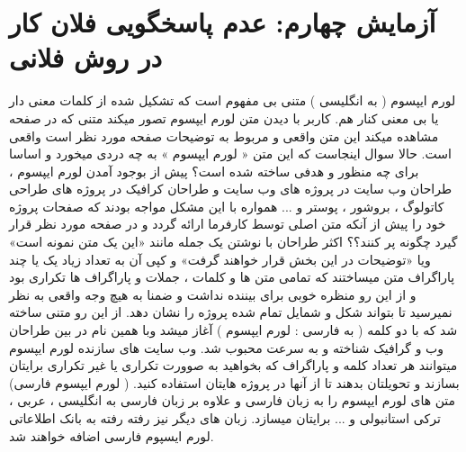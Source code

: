 \section{آزمایش چهارم: عدم پاسخگویی فلان کار در روش فلانی}
لورم ایپسوم ( به انگلیسی  ) متنی بی مفهوم است که تشکیل شده از کلمات معنی دار یا بی معنی کنار هم. کاربر با دیدن متن لورم ایپسوم تصور میکند متنی که در صفحه مشاهده میکند این متن واقعی و مربوط به توضیحات صفحه مورد نظر است واقعی است. حالا سوال اینجاست که این متن « لورم ایپسوم » به چه دردی میخورد و اساسا برای چه منظور و هدفی ساخته شده است؟ پیش از بوجود آمدن لورم ایپسوم ، طراحان وب سایت در پروژه های وب سایت و طراحان کرافیک در پروژه های طراحی کاتولوگ ، بروشور ، پوستر و ... همواره با این مشکل مواجه بودند که صفحات پروژه خود را پیش از آنکه متن اصلی توسط کارفرما ارائه گردد و در صفحه مورد نظر قرار گیرد چگونه پر کنند؟؟ اکثر طراحان با نوشتن یک جمله مانند «این یک متن نمونه است» ویا «توضیحات در این بخش قرار خواهند گرفت» و کپی آن به تعداد زیاد یک یا چند پاراگراف متن میساختند که تمامی متن ها و کلمات ، جملات و پاراگراف ها تکراری بود و از این رو منظره خوبی برای بیننده نداشت و ضمنا به هیچ وجه واقعی به نظر نمیرسید تا بتواند شکل و شمایل تمام شده پروژه را نشان دهد. از این رو متنی ساخته شد که با دو کلمه ( به فارسی : لورم ایپسوم ) آغاز میشد وبا همین نام در بین طراحان وب و گرافیک شناخته و به سرعت محبوب شد. وب سایت های سازنده لورم ایپسوم میتوانند هر تعداد کلمه و پاراگراف که بخواهید به صوورت تکراری یا غیر تکراری برایتان بسازند و تحویلتان بدهند تا از آنها در پروژه هایتان استفاده کنید. ( لورم ایپسوم فارسی) متن های لورم ایپسوم را به زبان فارسی و علاوه بر زبان فارسی به انگلیسی ، عربی ، ترکی استانبولی و ... برایتان میسازد. زبان های دیگر نیز رفته رفته به بانک اطلاعاتی لورم ایسپوم فارسی اضافه خواهند شد.  

